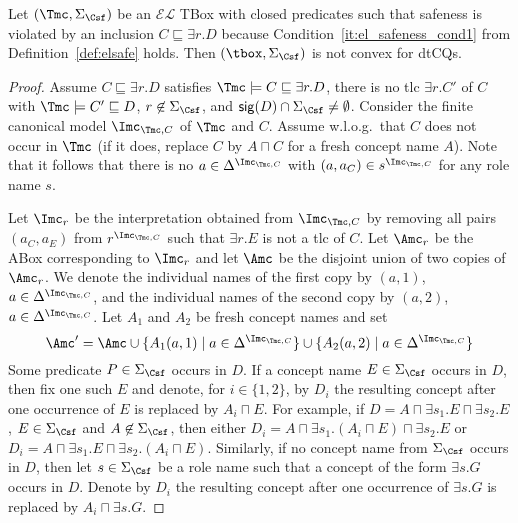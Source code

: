\documentclass{lmcs}
\theoremstyle{definition}
\begin{document}
\begin{lem}\label{lem:point1case1}
  Let $(\Tmc,\Sigma_\Csf)$ be an $\mathcal{EL}$ TBox with closed 
  predicates such that safeness is violated by an inclusion $C 
  \sqsubseteq \exists r.D$ because Condition~\ref{it:el_safeness_cond1} from Definition~\ref{def:elsafe}
  holds. Then $(\tbox,\Sigma_{\Csf})$ is not 
  convex for dtCQs.
\end{lem}
\begin{proof}
  Assume $C \sqsubseteq \exists r.D$ satisfies $\Tmc\models C \sqsubseteq \exists r.D$,
  there is no tlc $\exists r.C'$ of $C$ with $\Tmc\models C' \sqsubseteq D$, $r\not\in\Sigma_\Csf$,
  and ${\sf sig}(D) \cap \Sigma_\Csf\not=\emptyset$.
  Consider the finite canonical model
  $\Imc_{\Tmc,C}$ of $\Tmc$ and $C$. Assume w.l.o.g.\ that $C$ does not
  occur in $\Tmc$ (if it does, replace $C$ by $A\sqcap C$ for a fresh
  concept name $A$). Note that it follows that there is no
  $a\in \Delta^{\Imc_{\Tmc,C}}$ with $(a,a_{C})\in
  s^{\Imc_{\Tmc,C}}$ for any role name $s$. 
  
Let $\Imc_{r}$ be the interpretation obtained from $\Imc_{\Tmc,C}$ by removing all pairs $(a_{C},a_{E})$
from $r^{\Imc_{\Tmc,C}}$ such that $\exists r.E$ is not a tlc of $C$. Let $\Amc_{r}$ be the ABox corresponding 
to $\Imc_{r}$ and let $\Amc$ be the disjoint union of
two copies of $\Amc_{r}$. We denote the individual names of the first copy by $(a,1)$, $a\in \Delta^{\Imc_{\Tmc,C}}$, and the
individual names of the second copy by $(a,2)$, $a\in \Delta^{\Imc_{\Tmc,C}}$. Let $A_{1}$ and $A_{2}$ be fresh concept
names and set 
$$
\Amc'= \Amc \cup \{ A_{1}(a,1)\mid a\in \Delta^{\Imc_{\Tmc,C}}\} \cup
\{ A_{2}(a,2) \mid a\in \Delta^{\Imc_{\Tmc,C}}\}
$$   
Some predicate $P\in \Sigma_{\Csf}$ occurs in $D$. If a concept name $E\in \Sigma_\Csf$ occurs in $D$, then fix one such
$E$ and denote, for $i\in \{1,2\}$, by $D_{i}$ the resulting concept after one occurrence
of $E$ is replaced by $A_{i}\sqcap E$. For example, if $D=A \sqcap \exists s_{1}.E \sqcap \exists s_{2}.E$, $E\in \Sigma_{\Csf}$
and $A\not\in \Sigma_{\Csf}$, then either $D_{i}= A \sqcap \exists s_{1}.(A_{i} \sqcap E) \sqcap \exists s_{2}.E$ or
$D_{i} = A \sqcap \exists s_{1}.E \sqcap \exists s_{2}.(A_{i} \sqcap E)$. Similarly, if no concept name
from $\Sigma_\Csf$ occurs in $D$, then let $s\in \Sigma_\Csf$ be a role name such that a
concept of the form $\exists s.G$ occurs in $D$. Denote by $D_{i}$
the resulting concept after one occurrence of $\exists s.G$ is
replaced by $A_{i}\sqcap \exists s.G$.


\end{proof}
\end{document}

